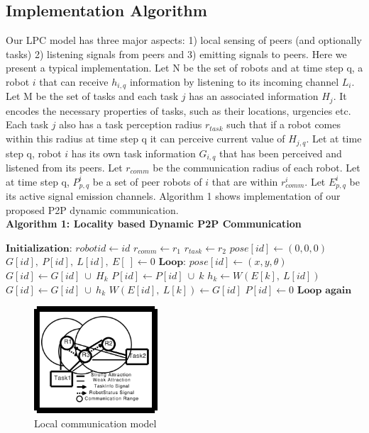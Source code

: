 \documentclass[letterpaper, 10 pt, conference]{ieeeconf}  %
\begin{document}
\subsection{Implementation Algorithm}
Our LPC model has three major aspects: 1) local sensing of peers (and optionally tasks) 2) listening signals from peers and 3) emitting signals to peers. Here we present a typical implementation.
Let N be the set of robots and at time step q, a robot $i$ that can receive  $h_{i,q}$ information by listening to its incoming channel $L_i$. Let M be the set of tasks and each task $j$ has an associated information $H_j$. It encodes the necessary properties of tasks, such as their locations, urgencies etc. Each task $j$ also has a task perception radius $r_{task}$ such that if a robot comes within this radius at time step q it can perceive current value of $H_{j,q}$. Let at time step q, robot $i$ has its own task information $G_{i, q}$ that has been perceived and listened from its peers. Let $r_{comm}$ be the communication radius of each robot. Let at time step q, $P_{p, q}^{i}$ be a set of peer robots of $i$ that are within $r_{comm}^{i}$. Let $E_{p, q}^{i}$ be its active signal emission channels. Algorithm 1
shows implementation of our proposed P2P dynamic communication.\\ 
% 
\textbf{\small Algorithm 1: Locality based Dynamic P2P Communication}
\begin{algorithmic}[1]
\label{alg:p2p-comm}
\State $\textbf{Initialization:}$
\State $robotid \gets id$
\State $r_{comm} \gets r_1$
\State $r_{task} \gets r_2$
\State $pose[id] \gets (0, 0, 0)$
\State $G[id], ~P[id], ~L[id], ~E[~] \gets 0$
\State $\textbf{Loop:}$
\State $pose[id] \gets (x, y, \theta)$
\State $G[id] \gets G[id] ~\cup ~ H_k$
\EndIf
\State $P[id] \gets P[id] ~ \cup ~ k$
\State $h_k \gets W(E[k],~ L[id])$
\State $G[id] \gets G[id] ~ \cup ~ h_k$
\EndIf
\State $ W(E[id],~L[k]) \gets G[id]$
\EndFor
\State $P[id] \gets 0$
\State $\textbf{Loop again}$
\end{algorithmic}
\begin{figure}[thpb]
\centering
\includegraphics[height=4cm, angle=0]{../dia-files/LocalComm.eps}
\caption{Local communication model}
\label{fig:lcm} %
\end{figure}
\end{document}
